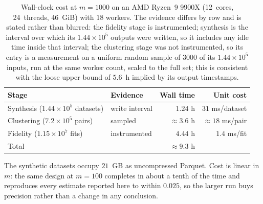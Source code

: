 \documentclass[pdflatex,sn-basic]{sn-jnl}
\providecommand{\DIFdelbegin}{} %
\providecommand{\DIFdelend}{} %
\newcommand{\DIFscaledelfig}{0.5}
\newlength{\DIFdelgraphicswidth} %
\newlength{\DIFdelgraphicsheight} %
\newcommand{\DIFdelincludegraphics}[2][]{%
\sbox{\DIFdelgraphicsbox}{\DIFOincludegraphics[#1]{#2}}%
\settoboxwidth{\DIFdelgraphicswidth}{\DIFdelgraphicsbox} %
\settoboxtotalheight{\DIFdelgraphicsheight}{\DIFdelgraphicsbox} %
\scalebox{\DIFscaledelfig}{%
\parbox[b]{\DIFdelgraphicswidth}{\usebox{\DIFdelgraphicsbox}\\[-\baselineskip] \rule{\DIFdelgraphicswidth}{0em}}\llap{\resizebox{\DIFdelgraphicswidth}{\DIFdelgraphicsheight}{%
\setlength{\unitlength}{\DIFdelgraphicswidth}%
\begin{picture}(1,1)%
\thicklines\linethickness{2pt} %
{\color[rgb]{1,0,0}\put(0,0){\framebox(1,1){}}}%
{\color[rgb]{1,0,0}\put(0,0){\line( 1,1){1}}}%
{\color[rgb]{1,0,0}\put(0,1){\line(1,-1){1}}}%
\end{picture}%
}\hspace*{3pt}}} %
} %
\DeclareRobustCommand{\DIFdelbegin}{\DIFOdelbegin \let\includegraphics\DIFdelincludegraphics} %
\DeclareRobustCommand{\DIFdelend}{\DIFOaddend \let\includegraphics\DIFOincludegraphics} %
\begin{document}
\begin{appendices}
\begin{table}[h]
\centering
\caption{Wall-clock cost at $m = 1000$ on an AMD Ryzen~9 9900X (12~cores,
         24~threads, $46$~GiB) with $18$ workers. The evidence differs by row
         and is stated rather than blurred: the fidelity stage is instrumented;
         synthesis is the interval over which its $1.44 \times 10^{5}$ outputs
         were written, so it includes any idle time inside that interval; the
         clustering stage was not instrumented, so its entry is a measurement
         on a uniform random sample of $3000$ of its $1.44 \times 10^{5}$ inputs,
         run at the same worker count, scaled to the full set; this is consistent
         with the loose upper bound of $5.6$~h implied by its output
         timestamps.}
\label{tab:cost}
\small
\begin{tabular}{llrr}
\toprule
Stage & Evidence & Wall time & Unit cost \\
\midrule
Synthesis ($1.44 \times 10^{5}$ datasets) & write interval & $1.24$ h & $31$ ms/dataset \\
Clustering ($7.2 \times 10^{5}$ pairs)    & sampled        & $\approx 3.6$ h & $\approx 18$ ms/pair \\
Fidelity ($1.15 \times 10^{7}$ fits)      & instrumented   & $4.44$ h & $1.4$ ms/fit \\
\midrule
Total & & $\approx 9.3$ h & \\
\bottomrule
\end{tabular}
\end{table}

The synthetic datasets occupy $21$~GB as uncompressed Parquet. Cost is linear in
$m$: the same design at $m = 100$ completes in about a tenth of the time and
reproduces every estimate reported here to within $0.025$, so the larger run
buys precision rather than a change in any conclusion.


\end{appendices}
\DIFdelbegin %

\DIFdelend 
\end{document}

